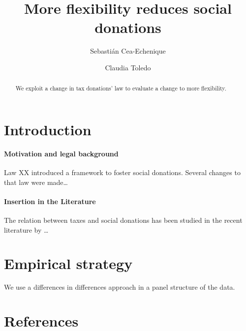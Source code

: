 \documentclass[]{elsarticle} %
\begin{document}
\begin{frontmatter}

  \title{More flexibility reduces social donations}
    \author[School of Industrial Engineering, Pontificia Universidad Católica de
Valparaíso]{Sebastián Cea-Echenique}
    \author[School of Industrial Engineering, Pontificia Universidad Católica de
Valparaíso]{Claudia Toledo}
  
  \begin{abstract}
  We exploit a change in tax donations' law to evaluate a change to more
  flexibility.
  \end{abstract}
  
 \end{frontmatter}

\hypertarget{introduction}{%
\section{Introduction}\label{introduction}}

\hypertarget{motivation-and-legal-background}{%
\paragraph{Motivation and legal
background}\label{motivation-and-legal-background}}

Law XX introduced a framework to foster social donations. Several
changes to that law were made\ldots{}

\hypertarget{insertion-in-the-literature}{%
\paragraph{Insertion in the
Literature}\label{insertion-in-the-literature}}

The relation between taxes and social donations has been studied in the
recent literature by \ldots{}

\hypertarget{empirical-strategy}{%
\section{Empirical strategy}\label{empirical-strategy}}

We use a differences in differences approach in a panel structure of the
data.

\hypertarget{references}{%
\section*{References}\label{references}}
\end{document}
